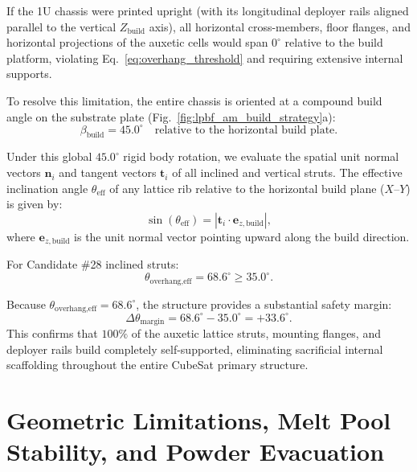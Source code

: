 If the 1U chassis were printed upright (with its longitudinal deployer rails aligned parallel to the vertical $Z_{\text{build}}$ axis), all horizontal cross-members, floor flanges, and horizontal projections of the auxetic cells would span $0^\circ$ relative to the build platform, violating Eq.~\eqref{eq:overhang_threshold} and requiring extensive internal supports.

To resolve this limitation, the entire chassis is oriented at a compound build angle on the substrate plate (Fig.~\ref{fig:lpbf_am_build_strategy}a):
\begin{equation}
\beta_{\text{build}} = 45.0^\circ \quad \text{relative to the horizontal build plate}.
\label{eq:chassis_build_angle}
\end{equation}

Under this global $45.0^\circ$ rigid body rotation, we evaluate the spatial unit normal vectors $\mathbf{n}_i$ and tangent vectors $\mathbf{t}_i$ of all inclined and vertical struts. The effective inclination angle $\theta_{\text{eff}}$ of any lattice rib relative to the horizontal build plane ($X\text{--}Y$) is given by:
\begin{equation}
\sin(\theta_{\text{eff}}) = |\mathbf{t}_i \cdot \mathbf{e}_{z,\text{build}}|,
\label{eq:effective_angle_strut}
\end{equation}
where $\mathbf{e}_{z,\text{build}}$ is the unit normal vector pointing upward along the build direction.

For Candidate \#28 inclined struts:
\begin{equation}
\theta_{\text{overhang,eff}} = 68.6^\circ \ge 35.0^\circ.
\label{eq:candidate28_overhang_compliance}
\end{equation}

Because $\theta_{\text{overhang,eff}} = 68.6^\circ$, the structure provides a substantial safety margin:
\begin{equation}
\Delta \theta_{\text{margin}} = 68.6^\circ - 35.0^\circ = +33.6^\circ.
\label{eq:overhang_margin}
\end{equation}
This confirms that $100\%$ of the auxetic lattice struts, mounting flanges, and deployer rails build completely self-supported, eliminating sacrificial internal scaffolding throughout the entire CubeSat primary structure.

\section{Geometric Limitations, Melt Pool Stability, and Powder Evacuation}
\label{sec:geometric_limits}

